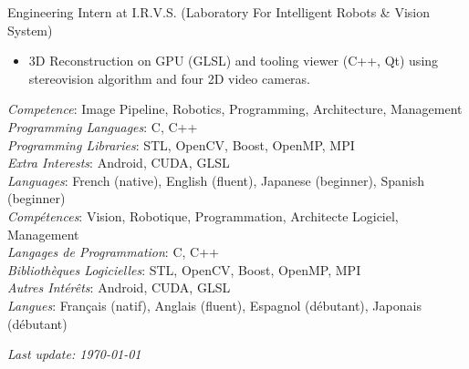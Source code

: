 \documentclass{article}
\begin{document}
\begin{llist}
 {
Engineering Intern at I.R.V.S. (Laboratory For Intelligent Robots \& Vision System)
\vspace{-0.33cm}
\begin{itemize}
\item 3D Reconstruction on GPU (GLSL) and tooling viewer (C++, Qt) using stereovision algorithm and four 2D video cameras.
\end{itemize}
} {}

 {
{\em Competence}: Image Pipeline, Robotics, Programming, Architecture, Management \\
{\em Programming Languages}: C, C++ \\
{\em Programming Libraries}: STL, OpenCV, Boost, OpenMP, MPI \\
{\em Extra Interests}: Android, CUDA, GLSL \\
{\em Languages}: French (native), English (fluent), Japanese (beginner), Spanish
(beginner) \\
} {
{\em Comp\'{e}tences}: Vision, Robotique, Programmation, Architecte Logiciel,
Management \\
{\em Langages de Programmation}: C, C++ \\
{\em Biblioth\`{e}ques Logicielles}: STL, OpenCV, Boost, OpenMP, MPI \\
{\em Autres Int\'{e}r\^{e}ts}: Android, CUDA, GLSL \\
{\em Langues}: Fran\c{c}ais (natif), Anglais (fluent), Espagnol (d\'{e}butant),
Japonais (d\'{e}butant) \\
}


\end{llist}

{\em Last update: \today}
\end{document}

